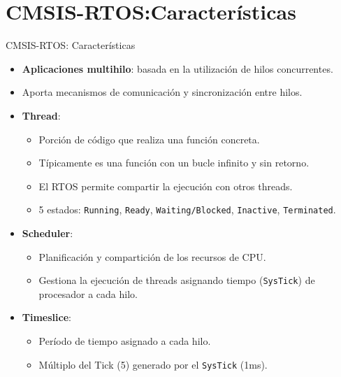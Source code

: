 \section{CMSIS-RTOS:Características}
\begin{frame}{CMSIS-RTOS: Características}
    \begin{itemize}
  \item \textbf{Aplicaciones multihilo}: basada en la utilización de hilos concurrentes.
  \item Aporta mecanismos de comunicación y sincronización entre hilos.
  \item \textbf{Thread}:
    \begin{itemize}
        \item Porción de código que realiza una función concreta.
        \item Típicamente es una función con un bucle infinito y sin retorno.
        \item El RTOS permite compartir la ejecución con otros threads.
        \item 5 estados: \texttt{Running}, \texttt{Ready}, \texttt{Waiting/Blocked}, \texttt{Inactive}, \texttt{Terminated}.
    \end{itemize}
  \item \textbf{Scheduler}:
    \begin{itemize}
        \item Planificación y compartición de los recursos de CPU.
        \item Gestiona la ejecución de threads asignando tiempo (\texttt{SysTick}) de procesador a cada hilo.
    \end{itemize}
  \item \textbf{Timeslice}:
    \begin{itemize}
        \item Período de tiempo asignado a cada hilo.
        \item Múltiplo del Tick (5) generado por el \texttt{SysTick} (1ms).
    \end{itemize}
\end{itemize}

\end{frame}


